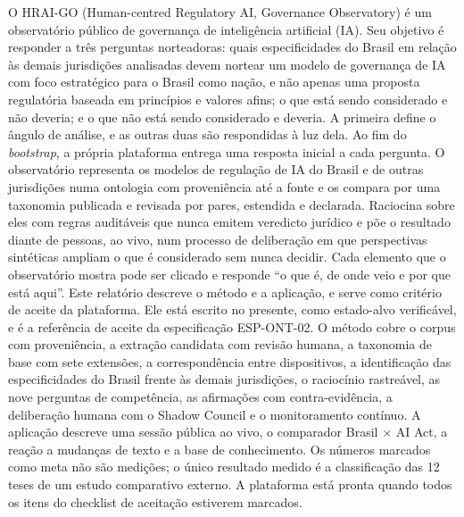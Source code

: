 \documentclass[12pt,a4paper,oneside,english,brazil]{abntex2}
\begin{document}

\pretextual
\imprimirfolhaderostorelatorio

\begin{resumorelatorio}
O HRAI-GO (Human-centred Regulatory AI, Governance Observatory) é um observatório público de governança de inteligência artificial (IA). Seu objetivo é responder a três perguntas norteadoras: quais especificidades do Brasil em relação às demais jurisdições analisadas devem nortear um modelo de governança de IA com foco estratégico para o Brasil como nação, e não apenas uma proposta regulatória baseada em princípios e valores afins; o que está sendo considerado e não deveria; e o que não está sendo considerado e deveria. A primeira define o ângulo de análise, e as outras duas são respondidas à luz dela. Ao fim do \emph{bootstrap}, a própria plataforma entrega uma resposta inicial a cada pergunta. O observatório representa os modelos de regulação de IA do Brasil e de outras jurisdições numa ontologia com proveniência até a fonte e os compara por uma taxonomia publicada e revisada por pares, estendida e declarada. Raciocina sobre eles com regras auditáveis que nunca emitem veredicto jurídico e põe o resultado diante de pessoas, ao vivo, num processo de deliberação em que perspectivas sintéticas ampliam o que é considerado sem nunca decidir. Cada elemento que o observatório mostra pode ser clicado e responde ``o que é, de onde veio e por que está aqui''. Este relatório descreve o método e a aplicação, e serve como critério de aceite da plataforma. Ele está escrito no presente, como estado-alvo verificável, e é a referência de aceite da especificação ESP-ONT-02. O método cobre o corpus com proveniência, a extração candidata com revisão humana, a taxonomia de base com sete extensões, a correspondência entre dispositivos, a identificação das especificidades do Brasil frente às demais jurisdições, o raciocínio rastreável, as nove perguntas de competência, as afirmações com contra-evidência, a deliberação humana com o Shadow Council e o monitoramento contínuo. A aplicação descreve uma sessão pública ao vivo, o comparador Brasil $\times$ AI Act, a reação a mudanças de texto e a base de conhecimento. Os números marcados como meta não são medições; o único resultado medido é a classificação das 12 teses de um estudo comparativo externo. A plataforma está pronta quando todos os itens do checklist de aceitação estiverem marcados.
\end{resumorelatorio}
\end{document}

